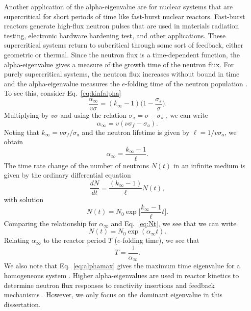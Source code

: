 
Another application of the alpha-eigenvalue are for nuclear systems that are supercritical for short periods of time like fast-burst nuclear reactors. Fast-burst reactors generate high-flux neutron pulses that are used in materials radiation testing, electronic hardware hardening test, and other applications. These supercritical systems return to subcritical through some sort of feedback, either geometric or thermal. Since the neutron flux is a time-dependent function, the alpha-eigenvalue gives a measure of the growth time of the neutron flux. For purely supercritical systems, the neutron flux increases without bound in time and the alpha-eigenvalue measures the $e$-folding time of the neutron population \cite{duderstadt_nuclear_1976}. To see this, consider Eq.~\ref{eq:kinfalpha}
\begin{equation*}
	\frac{\alpha_{\infty}}{v\sigma} = (k_{\infty}-1) \bigg ( 1 - \frac{\sigma_{s}}{\sigma} \bigg ).
\end{equation*}
Multiplying by $v\sigma$ and using the relation $\sigma_{a} = \sigma - \sigma_{s}$ , we can write
\begin{equation}
	\alpha_{\infty} = v(\nu \sigma_{f} - \sigma_{a}).
\end{equation}
Noting that $k_{\infty} = \nu \sigma_{f} / \sigma_{a}$ and the neutron lifetime is given by $\ell = 1/v\sigma_{a}$, we obtain
\begin{equation}
	\alpha_{\infty} = \frac{k_{\infty} - 1}{\ell}.
	\label{eq:alphamax}
\end{equation}
The time rate change of the number of neutrons $N(t)$ in an infinite medium is given by the ordinary differential equation
\begin{equation}
\frac{dN}{dt} = \frac{(k_{\infty} - 1)}{\ell} N(t),
\end{equation}
with solution
\begin{equation}
	N(t) = N_{0} \exp \bigg [ \frac{k_{\infty}-1}{\ell} t \bigg ].
	\label{eq:Nt}
\end{equation}
Comparing the relationship for $\alpha_{\infty}$ and Eq.~\ref{eq:Nt}, we see that we can write
\begin{equation}
	N(t) = N_{0} \exp (\alpha_{\infty} t).
\end{equation}
Relating $\alpha_{\infty}$ to the reactor period $T$ ($e$-folding time), we see that
\begin{equation}
	T = \frac{1}{\alpha_{\infty}}.
\end{equation}
We also note that Eq.~\ref{eq:alphamax} gives the maximum time eigenvalue for a homogeneous system \cite{kornreich_timeeigenvalue_2005}. Higher alpha-eigenvalues are used in reactor kinetics to determine neutron flux responses to reactivity insertions and feedback mechanisms \cite{modak_scheme_2007}. However, we only focus on the dominant eigenvalue in this dissertation. 

